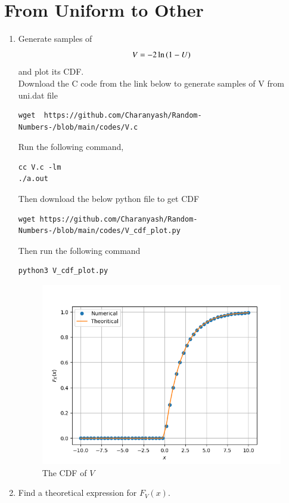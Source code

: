 \documentclass[journal,12pt,twocolumn]{IEEEtran}
\renewcommand\thesection{\arabic{section}}
\begin{document}
\section{From Uniform to Other}
\begin{enumerate}[label=\thesection.\arabic*,ref=\thesection.\theenumi]
%
\item
Generate samples of 
%
\begin{equation}
V = -2\ln\left(1-U\right)
\end{equation}
%
and plot its CDF.\\
\solution Download the C code from the link below to generate samples of V from uni.dat file
\begin{lstlisting}
wget  https://github.com/Charanyash/Random-Numbers-/blob/main/codes/V.c
\end{lstlisting}
Run the following command,
\begin{lstlisting}
cc V.c -lm
./a.out
\end{lstlisting}
Then download the below python file to get CDF
\begin{lstlisting}
wget https://github.com/Charanyash/Random-Numbers-/blob/main/codes/V_cdf_plot.py
\end{lstlisting}
Then run the following command
\begin{lstlisting}
python3 V_cdf_plot.py
\end{lstlisting}
\begin{figure}
\centering
\includegraphics[width=\columnwidth]{figs/V_cdf.png}
\caption{The CDF of $V$}
\label{fig:V_cdf}
\end{figure}
\item Find a theoretical expression for $F_V(x)$.\\

\end{enumerate}
\end{document}
